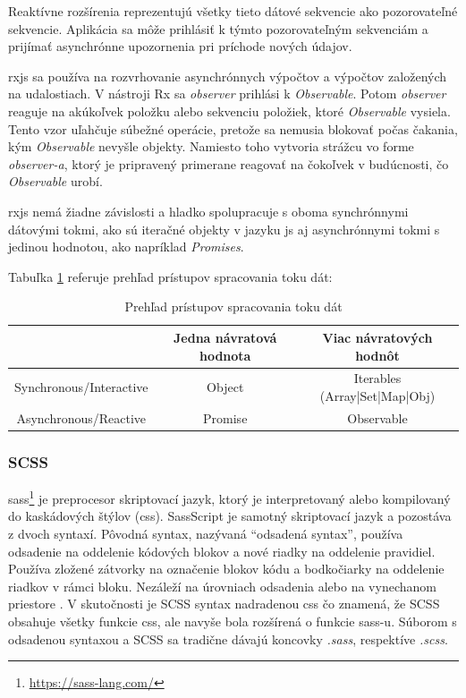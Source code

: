 Reaktívne rozšírenia reprezentujú všetky tieto dátové sekvencie ako pozorovateľné
sekvencie. Aplikácia sa môže prihlásiť k týmto pozorovateľným sekvenciám a prijímať
asynchrónne upozornenia pri príchode nových údajov.

\acrshort{rxjs} sa používa na rozvrhovanie asynchrónnych výpočtov a výpočtov založených na udalostiach.
V nástroji Rx sa \textit{observer} prihlási k \textit{Observable}. Potom \textit{observer} reaguje na akúkoľvek 
položku alebo sekvenciu položiek, ktoré \textit{Observable} vysiela. Tento vzor uľahčuje súbežné 
operácie, pretože sa nemusia blokovať počas čakania, kým \textit{Observable} nevyšle objekty.
Namiesto toho vytvoria strážcu vo forme \textit{observer-a}, ktorý je pripravený primerane 
reagovať na čokoľvek v budúcnosti, čo \textit{Observable} urobí.

\acrshort{rxjs} nemá žiadne závislosti a hladko spolupracuje s oboma
synchrónnymi dátovými tokmi, ako sú iteračné objekty v jazyku \acrlong{js} aj asynchrónnymi
tokmi s jedinou hodnotou, ako napríklad \textit{Promises}. \cite{rxjs}

Tabuľka \ref{table:2} referuje prehľad prístupov spracovania toku dát:
 
\begin{table}[h!]
\centering
\begin{tabular}{| c || c | c |} 
 \hline
& Jedna návratová hodnota & Viac návratových hodnôt \\ [0.5ex] 
\hline\hline
Synchronous/Interactive & Object & Iterables (Array|Set|Map|Obj)\\ 
\hline
Asynchronous/Reactive & Promise & Observable \\ 
\hline
\end{tabular}
\caption{Prehľad prístupov spracovania toku dát \cite{rxjs}}
\label{table:2}
\end{table}

\subsubsection{SCSS}
\label{subsubsec:scss}

\acrshort{sass}\footnote{\url{https://sass-lang.com/}} je preprocesor skriptovací jazyk, ktorý je interpretovaný alebo kompilovaný do
kaskádových štýlov (\acrshort{css}). SassScript je samotný skriptovací jazyk a pozostáva z dvoch syntaxí.
Pôvodná syntax, nazývaná ``odsadená syntax'', používa odsadenie na oddelenie kódových blokov
a nové riadky na oddelenie pravidiel. Používa zložené zátvorky na označenie blokov kódu
a bodkočiarky na oddelenie riadkov v rámci bloku. Nezáleží na úrovniach odsadenia alebo na
vynechanom priestore \cite{sass}. V skutočnosti je SCSS syntax nadradenou \acrshort{css} čo znamená, že SCSS
obsahuje všetky funkcie \acrshort{css}, ale navyše bola rozšírená o funkcie \acrshort{sass}-u. Súborom s odsadenou
syntaxou a SCSS sa tradične dávajú koncovky \textit{.sass}, respektíve \textit{.scss}. 

